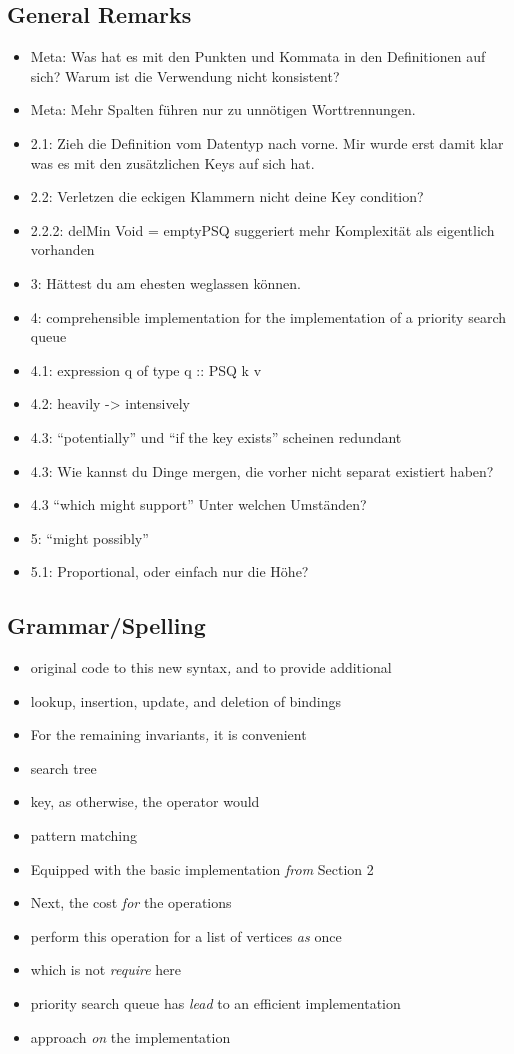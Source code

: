 \documentclass{article}
\begin{document}
\subsection{General Remarks}
\begin{itemize}
    \item Meta: Was hat es mit den Punkten und Kommata in den Definitionen auf sich? Warum ist die Verwendung nicht konsistent?
    \item Meta: Mehr Spalten führen nur zu unnötigen Worttrennungen.
    \item 2.1: Zieh die Definition vom Datentyp nach vorne. Mir wurde erst damit klar was es mit den zusätzlichen Keys auf sich hat.
    \item 2.2: Verletzen die eckigen Klammern nicht deine Key condition?
    \item 2.2.2: delMin Void = emptyPSQ suggeriert mehr Komplexität als eigentlich vorhanden
    \item 3: Hättest du am ehesten weglassen können.
    \item 4: comprehensible implementation for the implementation of a priority search queue
    \item 4.1: expression q of type q :: PSQ k v
    \item 4.2: heavily -> intensively 
    \item 4.3: “potentially” und  “if the key exists” scheinen redundant
    \item 4.3: Wie kannst du Dinge mergen, die vorher nicht separat existiert haben?
    \item 4.3 “which might support” Unter welchen Umständen?
    \item 5: “might possibly”
    \item 5.1: Proportional, oder einfach nur die Höhe?    
\end{itemize}

\subsection{Grammar/Spelling}
\begin{itemize}
    \item original code to this new syntax\emph{,} and to provide additional
    \item lookup, insertion, update\emph{,} and deletion of bindings
    \item For the remaining invariants\emph{,} it is convenient
    \item search tree
    \item key, as otherwise\emph{,} the operator would
    \item pattern matching
    \item Equipped with the basic implementation \emph{from} Section 2
    \item Next, the cost \emph{for} the operations
    \item perform this operation for a list of vertices \emph{as} once
    \item which is not \emph{require} here
    \item priority search queue has \emph{lead} to an efficient implementation
    \item approach \emph{on} the implementation
\end{itemize}
\end{document}
